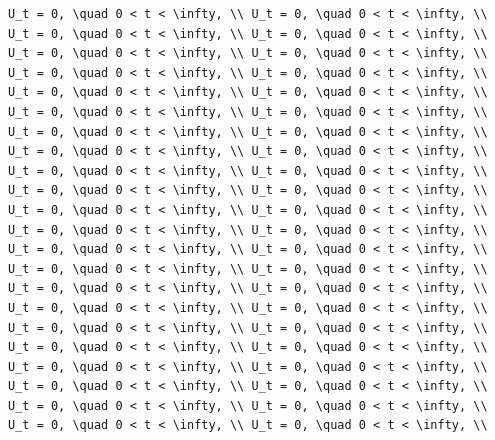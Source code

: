 \documentclass[
  ukrainian,
]{article}
\begin{document}
\begin{verbatim}
U_t = 0, \quad 0 < t < \infty, \\ U_t = 0, \quad 0 < t < \infty, \\ U_t = 0, \quad 0 < t < \infty, \\ U_t = 0, \quad 0 < t < \infty, \\ U_t = 0, \quad 0 < t < \infty, \\ U_t = 0, \quad 0 < t < \infty, \\ U_t = 0, \quad 0 < t < \infty, \\ U_t = 0, \quad 0 < t < \infty, \\ U_t = 0, \quad 0 < t < \infty, \\ U_t = 0, \quad 0 < t < \infty, \\ U_t = 0, \quad 0 < t < \infty, \\ U_t = 0, \quad 0 < t < \infty, \\ U_t = 0, \quad 0 < t < \infty, \\ U_t = 0, \quad 0 < t < \infty, \\ U_t = 0, \quad 0 < t < \infty, \\ U_t = 0, \quad 0 < t < \infty, \\ U_t = 0, \quad 0 < t < \infty, \\ U_t = 0, \quad 0 < t < \infty, \\ U_t = 0, \quad 0 < t < \infty, \\ U_t = 0, \quad 0 < t < \infty, \\ U_t = 0, \quad 0 < t < \infty, \\ U_t = 0, \quad 0 < t < \infty, \\ U_t = 0, \quad 0 < t < \infty, \\ U_t = 0, \quad 0 < t < \infty, \\ U_t = 0, \quad 0 < t < \infty, \\ U_t = 0, \quad 0 < t < \infty, \\ U_t = 0, \quad 0 < t < \infty, \\ U_t = 0, \quad 0 < t < \infty, \\ U_t = 0, \quad 0 < t < \infty, \\ U_t = 0, \quad 0 < t < \infty, \\ U_t = 0, \quad 0 < t < \infty, \\ U_t = 0, \quad 0 < t < \infty, \\ U_t = 0, \quad 0 < t < \infty, \\ U_t = 0, \quad 0 < t < \infty, \\ U_t = 0, \quad 0 < t < \infty, \\ U_t = 0, \quad 0 < t < \infty, \\ U_t = 0, \quad 0 < t < \infty, \\ U_t = 0, \quad 0 < t < \infty, \\ U_t = 0, \quad 0 < t < \infty, \\ U_t = 0, \quad 0 < t < \infty, \\ U_t = 0, \quad 0 < t < \infty, \\ U_t = 0, \quad 0 < t < \infty, \\ U_t = 0, \quad 0 < t < \infty, \\ U_t = 0, \quad 0 < t < \infty, \\ 
\end{verbatim}
\end{document}
